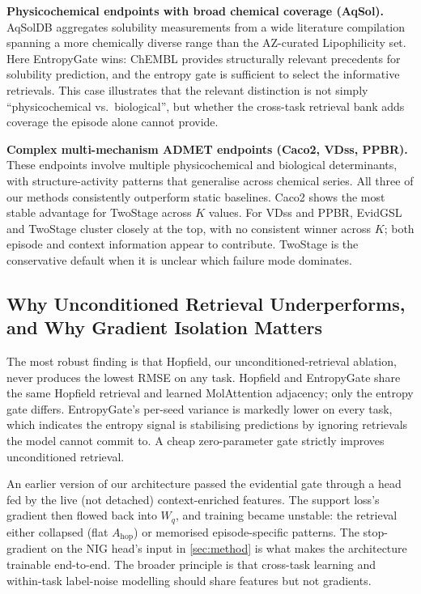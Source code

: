 \documentclass{article}
\theoremstyle{plain}
\theoremstyle{definition}
\theoremstyle{remark}
\begin{document}
\textbf{Physicochemical endpoints with broad chemical coverage (AqSol).} AqSolDB aggregates solubility measurements from a wide literature compilation spanning a more chemically diverse range than the AZ-curated Lipophilicity set. Here EntropyGate wins: ChEMBL provides structurally relevant precedents for solubility prediction, and the entropy gate is sufficient to select the informative retrievals. This case illustrates that the relevant distinction is not simply ``physicochemical vs.\ biological'', but whether the cross-task retrieval bank adds coverage the episode alone cannot provide.

\textbf{Complex multi-mechanism ADMET endpoints (Caco2, VDss, PPBR).} These endpoints involve multiple physicochemical and biological determinants, with structure-activity patterns that generalise across chemical series. All three of our methods consistently outperform static baselines. Caco2 shows the most stable advantage for TwoStage across $K$ values. For VDss and PPBR, EvidGSL and TwoStage cluster closely at the top, with no consistent winner across $K$; both episode and context information appear to contribute. TwoStage is the conservative default when it is unclear which failure mode dominates.

\subsection{Why Unconditioned Retrieval Underperforms, and Why Gradient Isolation Matters}

The most robust finding is that Hopfield, our unconditioned-retrieval ablation, never produces the lowest RMSE on any task. Hopfield and EntropyGate share the same Hopfield retrieval and learned MolAttention adjacency; only the entropy gate differs. EntropyGate's per-seed variance is markedly lower on every task, which indicates the entropy signal is stabilising predictions by ignoring retrievals the model cannot commit to. A cheap zero-parameter gate strictly improves unconditioned retrieval.

An earlier version of our architecture passed the evidential gate through a head fed by the live (not detached) context-enriched features. The support loss's gradient then flowed back into $W_q$, and training became unstable: the retrieval either collapsed (flat $A_{\text{hop}}$) or memorised episode-specific patterns. The stop-gradient on the NIG head's input in \cref{sec:method} is what makes the architecture trainable end-to-end. The broader principle is that cross-task learning and within-task label-noise modelling should share features but not gradients.
\end{document}

